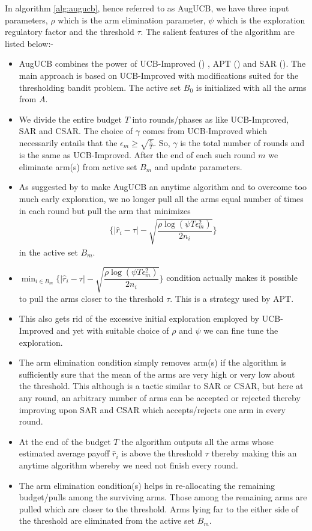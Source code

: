 In algorithm \ref{alg:augucb}, hence referred to as AugUCB, we have three input parameters, $\rho$ which is the arm elimination parameter, $\psi$ which is the exploration regulatory factor and the threshold $\tau$. The salient features of the algorithm are listed below:-
\begin{itemize}
\item AugUCB combines the power of UCB-Improved (\cite{auer2010ucb}) , APT (\cite{locatelli2016optimal}) and SAR (\cite{gabillon2011multi}). The main approach is based on UCB-Improved with modifications suited for the thresholding bandit problem. The active set $B_{0}$ is initialized with all the arms from $A$.
\item We divide the entire budget $T$ into rounds/phases as like UCB-Improved, SAR  and CSAR. The choice of $\gamma$ comes from UCB-Improved which necessarily entails that the $\epsilon_{m}\geq \sqrt{\frac{e}{T}}$. So, $\gamma$ is the total number of rounds and is the same as UCB-Improved. After the end of each such round $m$ we eliminate arm(s) from active set $B_{m}$ and update parameters.
\item As suggested by \cite{liu2016modification} to make AugUCB an anytime algorithm and to overcome too much early exploration, we no longer pull all the arms equal number of times in each round but pull the arm that minimizes 
\begin{align*}
\bigg\lbrace |\hat{r}_{i} - \tau | - \sqrt{\dfrac{\rho \log (\psi T \epsilon_{m}^{2})}{2 n_{i}}} \bigg\rbrace
\end{align*}
in the active set $B_{m}$. 
\item $\min_{i\in B_{m}}\bigg\lbrace |\hat{r}_{i} - \tau | - \sqrt{\dfrac{\rho \log (\psi T \epsilon_{m}^{2})}{2 n_{i}}} \bigg\rbrace$ condition actually makes it possible to pull the arms closer to the threshold $\tau$. This is a strategy used by APT.
\item This also gets rid of the excessive initial exploration employed by UCB-Improved and yet with suitable choice of $\rho$ and $\psi$ we can fine tune the exploration.
\item The arm elimination condition simply removes arm(s) if the algorithm is sufficiently sure that the mean of the arms are very high or very low about the threshold. This although is a tactic similar to SAR or CSAR, but here at any round, an arbitrary number of arms can be accepted or rejected thereby improving upon SAR and CSAR which accepts/rejects one arm in every round.
\item At the end of the budget $T$ the algorithm outputs all the arms whose estimated average payoff $\hat{r}_{i}$ is above the threshold $\tau$ thereby making this an anytime algorithm whereby we need not finish every round.
\item The arm elimination condition(s) helps in re-allocating the remaining budget/pulls among the surviving arms. Those among the remaining arms are pulled which are closer to the threshold. Arms lying far to the either side of the threshold are eliminated from the active set $B_{m}$.
\end{itemize}